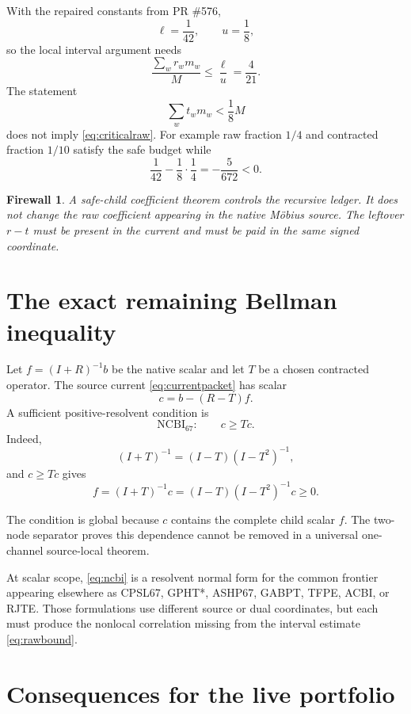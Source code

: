 \documentclass[11pt]{article}
\newtheorem{firewall}[theorem]{Firewall}
\newcommand{\1}{\mathbf 1}
\newcommand{\NCBI}{\mathrm{NCBI}_{67}}
\begin{document}
With the repaired constants from PR \#576,
\[
 \ell=\frac1{42},\qquad u=\frac18,
\]
so the local interval argument needs
\begin{equation}
 \frac{\sum_wr_wm_w}{M}\le\frac{\ell}{u}=\frac4{21}.
 \label{eq:criticalraw}
\end{equation}
The statement
\[
 \sum_wt_wm_w<\frac18M
\]
does not imply \eqref{eq:criticalraw}.  For example raw fraction $1/4$ and
contracted fraction $1/10$ satisfy the safe budget while
\[
 \frac1{42}-\frac18\cdot\frac14=-\frac5{672}<0.
\]

\begin{firewall}
A safe-child coefficient theorem controls the recursive ledger.  It does not
change the raw coefficient appearing in the native Möbius source.  The leftover
$r-t$ must be present in the current and must be paid in the same signed
coordinate.
\end{firewall}

\section{The exact remaining Bellman inequality}

Let $f=(I+R)^{-1}b$ be the native scalar and let $T$ be a chosen contracted
operator.  The source current \eqref{eq:currentpacket} has scalar
\[
 c=b-(R-T)f.
\]
A sufficient positive-resolvent condition is
\begin{equation}
 \boxed{
 \NCBI:\qquad c\ge Tc.
 }
 \label{eq:ncbi}
\end{equation}
Indeed,
\[
 (I+T)^{-1}=(I-T)(I-T^2)^{-1},
\]
and $c\ge Tc$ gives
\[
 f=(I+T)^{-1}c=(I-T)(I-T^2)^{-1}c\ge0.
\]

The condition is global because $c$ contains the complete child scalar $f$.
The two-node separator proves this dependence cannot be removed in a universal
one-channel source-local theorem.

At scalar scope, \eqref{eq:ncbi} is a resolvent normal form for the common
frontier appearing elsewhere as CPSL67, GPHT*, ASHP67, GABPT, TFPE, ACBI, or
RJTE.  Those formulations use different source or dual coordinates, but each
must produce the nonlocal correlation missing from the interval estimate
\eqref{eq:rawbound}.

\section{Consequences for the live portfolio}
\end{document}
